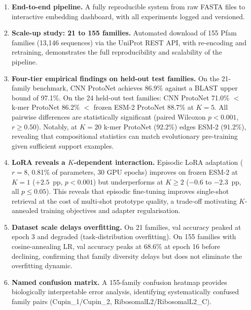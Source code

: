 \documentclass[11pt,a4paper]{article}
\begin{document}
\begin{enumerate}[leftmargin=*,noitemsep]
  \item \textbf{End-to-end pipeline.} A fully reproducible system from raw FASTA
        files to interactive embedding dashboard, with all experiments logged and
        versioned.

  \item \textbf{Scale-up study: 21 to 155 families.} Automated download of
        155 Pfam families (13,146 sequences) via the UniProt REST API, with
        re-encoding and retraining, demonstrates the full reproducibility and
        scalability of the pipeline.

  \item \textbf{Four-tier empirical findings on held-out test families.}
        On the 21-family benchmark, CNN ProtoNet achieves 86.9\% against a
        BLAST upper bound of 97.1\%.  On the 24 held-out test families:
        CNN ProtoNet 71.0\% $<$ k-mer ProtoNet 86.2\% $<$ frozen ESM-2
        ProtoNet 88.7\% at $K=5$.  All pairwise differences are statistically
        significant (paired Wilcoxon $p < 0.001$, $r \geq 0.50$).  Notably,
        at $K=20$ k-mer ProtoNet (92.2\%) edges ESM-2 (91.2\%), revealing that
        compositional statistics can match evolutionary pre-training given
        sufficient support examples.

  \item \textbf{LoRA reveals a $K$-dependent interaction.}
        Episodic LoRA adaptation ($r=8$, 0.81\% of parameters, 30 GPU epochs)
        improves on frozen ESM-2 at $K=1$ ($+2.5$~pp, $p < 0.001$) but
        underperforms at $K \geq 2$ ($-0.6$ to $-2.3$~pp, all $p \leq 0.05$).
        This reveals that episodic fine-tuning improves single-shot retrieval at
        the cost of multi-shot prototype quality, a trade-off motivating
        $K$-annealed training objectives and adapter regularisation.

  \item \textbf{Dataset scale delays overfitting.} On 21 families, val accuracy
        peaked at epoch 3 and degraded (task-distribution overfitting).
        On 155 families with cosine-annealing LR, val accuracy peaks at 68.6\%
        at epoch 16 before declining, confirming that family diversity delays
        but does not eliminate the overfitting dynamic.

  \item \textbf{Named confusion matrix.} A 155-family confusion heatmap provides
        biologically interpretable error analysis, identifying systematically
        confused family pairs (Cupin\_1/Cupin\_2, RibosomalL2/RibosomalL2\_C).
\end{enumerate}
\end{document}
